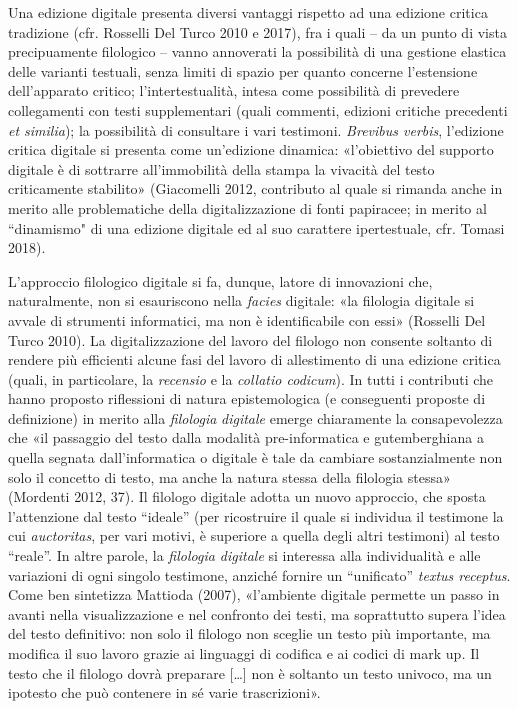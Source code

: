 \documentclass[
  b5paper,
  twoside,
  12pt,
  chapterprefix=false,
  bibliography=totocnumbered,
  parskip=false]{scrbook}
\begin{document}
Una edizione digitale presenta diversi vantaggi rispetto ad una edizione
critica tradizione (cfr. Rosselli Del Turco 2010 e 2017), fra i quali --
da un punto di vista precipuamente filologico -- vanno annoverati la
possibilità di una gestione elastica delle varianti testuali, senza
limiti di spazio per quanto concerne l'estensione dell'apparato critico;
l'intertestualità, intesa come possibilità di prevedere collegamenti con
testi supplementari (quali commenti, edizioni critiche precedenti \emph{et
similia}); la possibilità di consultare i vari testimoni. \emph{Brevibus
verbis}, l'edizione critica digitale si presenta come un'edizione
dinamica: «l'obiettivo del supporto digitale è di sottrarre
all'immobilità della stampa la vivacità del testo criticamente
stabilito» (Giacomelli 2012, contributo al quale si rimanda anche in
merito alle problematiche della digitalizzazione di fonti papiracee; in
merito al ``dinamismo" di una edizione digitale ed al suo carattere
ipertestuale, cfr. Tomasi 2018).

L'approccio filologico digitale si fa, dunque, latore di innovazioni
che, naturalmente, non si esauriscono nella \emph{facies} digitale: «la
filologia digitale si avvale di strumenti informatici, ma non è
identificabile con essi» (Rosselli Del Turco 2010). La
digitalizzazione del lavoro del filologo non consente soltanto di
rendere più efficienti alcune fasi del lavoro di allestimento di una
edizione critica (quali, in particolare, la \emph{recensio} e la \emph{collatio
codicum}). In tutti i contributi che hanno proposto riflessioni di
natura epistemologica (e conseguenti proposte di definizione) in merito
alla \emph{filologia} \emph{digitale} emerge chiaramente la consapevolezza che «il
passaggio del testo dalla modalità pre-informatica e gutemberghiana a
quella segnata dall'informatica o digitale è tale da cambiare
sostanzialmente non solo il concetto di testo, ma anche la natura stessa
della filologia stessa» (Mordenti 2012, 37). Il filologo digitale adotta
un nuovo approccio, che sposta l'attenzione dal testo \enquote{ideale} (per
ricostruire il quale si individua il testimone la cui \emph{auctoritas}, per
vari motivi, è superiore a quella degli altri testimoni) al testo
\enquote{reale}. In altre parole, la \emph{filologia digitale} si interessa alla
individualità e alle variazioni di ogni singolo testimone, anziché
fornire un \enquote{unificato} \emph{textus receptus}. Come ben sintetizza Mattioda
(2007), «l'ambiente digitale permette un passo in avanti nella
visualizzazione e nel confronto dei testi, ma soprattutto supera l'idea
del testo definitivo: non solo il filologo non sceglie un testo più
importante, ma modifica il suo lavoro grazie ai linguaggi di codifica e
ai codici di mark up\emph{.} Il testo che il filologo dovrà preparare
{[}\ldots{]} non è soltanto un testo univoco, ma un ipotesto che può
contenere in sé varie trascrizioni».
\end{document}

